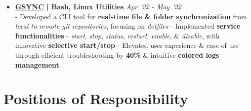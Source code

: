 \documentclass[a4paper,10pt]{extarticle} %
\begin{document}
\begin{itemize}[leftmargin=0.55cm, rightmargin=0.2cm, label={\Large\textbullet}]
\item \textbf{\href{https://github.com/proffapt/gsync}{GSYNC} | Bash, Linux Utilities} \hfill{\textit{Apr '22 - May '22}} \\
- Developed a CLI tool for \textbf{real-time file \& folder synchronization} from \textit{local to remote git repositories}, focusing on \textit{dotfiles} \newline
- Implemented \textbf{service functionalities} - \textit{start}, \textit{stop}, \textit{status}, \textit{restart}, \textit{enable}, \& \textit{disable}, with innovative \textbf{selective start/stop} \newline
- Elevated user experience \& ease of use through efficient troubleshooting by \textbf{40\%} \& intuitive \textbf{colored logs management}

\end{itemize}


\vspace{0.2cm}
\section{\textcolor{primary}{Positions of Responsibility}}
\vspace{+0.2cm}
\end{document}
